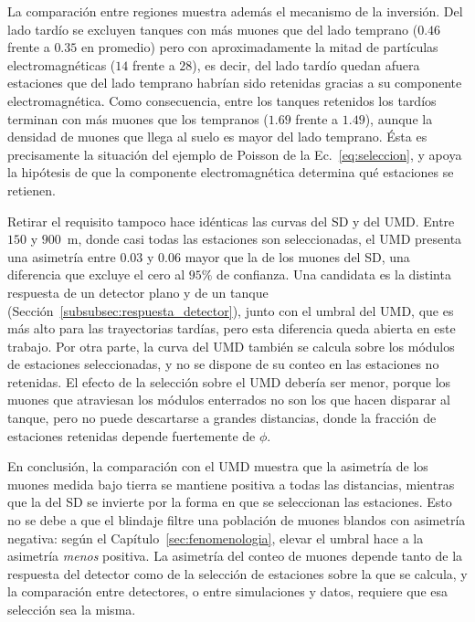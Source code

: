 {\leavevmode\color{blue}La comparación entre regiones muestra además el mecanismo de la inversión. Del lado tardío se excluyen tanques con más muones que del lado temprano ($0.46$ frente a $0.35$ en promedio) pero con aproximadamente la mitad de partículas electromagnéticas ($14$ frente a $28$), es decir, del lado tardío quedan afuera estaciones que del lado temprano habrían sido retenidas gracias a su componente electromagnética. Como consecuencia, entre los tanques retenidos los tardíos terminan con más muones que los tempranos ($1.69$ frente a $1.49$), aunque la densidad de muones que llega al suelo es mayor del lado temprano. Ésta es precisamente la situación del ejemplo de Poisson de la Ec.~\ref{eq:seleccion}, y apoya la hipótesis de que la componente electromagnética determina qué estaciones se retienen.}

{\leavevmode\color{blue}Retirar el requisito tampoco hace idénticas las curvas del SD y del UMD. Entre $150$ y $900$~m, donde casi todas las estaciones son seleccionadas, el UMD presenta una asimetría entre $0.03$ y $0.06$ mayor que la de los muones del SD, una diferencia que excluye el cero al $95\%$ de confianza. Una candidata es la distinta respuesta de un detector plano y de un tanque (Sección~\ref{subsubsec:respuesta_detector}), junto con el umbral del UMD, que es más alto para las trayectorias tardías, pero esta diferencia queda abierta en este trabajo. Por otra parte, la curva del UMD también se calcula sobre los módulos de estaciones seleccionadas, y no se dispone de su conteo en las estaciones no retenidas. El efecto de la selección sobre el UMD debería ser menor, porque los muones que atraviesan los módulos enterrados no son los que hacen disparar al tanque, pero no puede descartarse a grandes distancias, donde la fracción de estaciones retenidas depende fuertemente de $\phi$.}

{\leavevmode\color{blue}En conclusión, la comparación con el UMD muestra que la asimetría de los muones medida bajo tierra se mantiene positiva a todas las distancias, mientras que la del SD se invierte por la forma en que se seleccionan las estaciones. Esto no se debe a que el blindaje filtre una población de muones blandos con asimetría negativa: según el Capítulo~\ref{sec:fenomenologia}, elevar el umbral hace a la asimetría \textit{menos} positiva. La asimetría del conteo de muones depende tanto de la respuesta del detector como de la selección de estaciones sobre la que se calcula, y la comparación entre detectores, o entre simulaciones y datos, requiere que esa selección sea la misma.}

